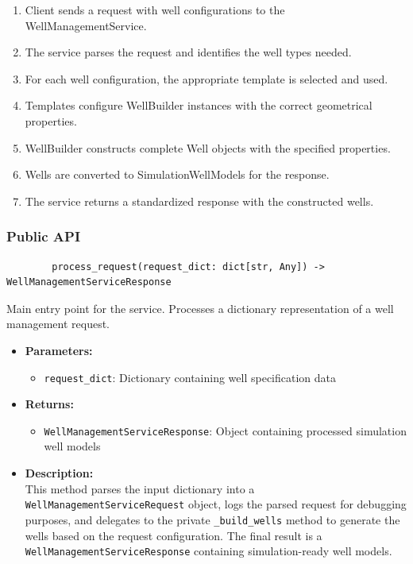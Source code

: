 \begin{enumerate}
	\item Client sends a request with well configurations to the WellManagementService.
	\item The service parses the request and identifies the well types needed.
	\item For each well configuration, the appropriate template is selected and used.
	\item Templates configure WellBuilder instances with the correct geometrical properties.
	\item WellBuilder constructs complete Well objects with the specified properties.
	\item Wells are converted to SimulationWellModels for the response.
	\item The service returns a standardized response with the constructed wells.
\end{enumerate}


\subsubsection{Public API}

	\begin{verbatim}
		process_request(request_dict: dict[str, Any]) -> WellManagementServiceResponse
	\end{verbatim}

Main entry point for the service. Processes a dictionary representation of a well management request.

\begin{itemize}
	\item \textbf{Parameters:}
	\begin{itemize}
		\item \texttt{request\_dict}: Dictionary containing well specification data
	\end{itemize}
	\item \textbf{Returns:}
	\begin{itemize}
		\item \texttt{WellManagementServiceResponse}: Object containing processed simulation well models
	\end{itemize}
	\item \textbf{Description:}\\
	This method parses the input dictionary into a \texttt{WellManagementServiceRequest} object, logs the parsed request for debugging purposes, and delegates to the private \texttt{\_build\_wells} method to generate the wells based on the request configuration. The final result is a \texttt{WellManagementServiceResponse} containing simulation-ready well models.
\end{itemize}

